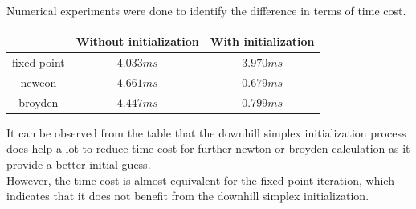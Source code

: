 \documentclass[paper=a4, fontsize=11pt]{scrartcl} %
\numberwithin{equation}{section} %
\numberwithin{figure}{section} %
\numberwithin{table}{section} %
\begin{document}
	Numerical experiments were done to identify the difference in terms of time cost. 
	
	\begin{center}
		\begin{tabular}{ccc}
			\hline
			\quad       & Without initialization & With initialization\\
			\hline
			fixed-point & $4.033 ms$             & $3.970 ms$\\
			neweon      & $4.661 ms$             & $0.679 ms$\\
			broyden     & $4.447 ms$             & $0.799 ms$\\
			\hline
		\end{tabular}
	\end{center}
	
	It can be observed from the table that the downhill simplex initialization process does help a lot to reduce time cost for further newton or broyden calculation as it provide a better initial guess. \\
	However, the time cost is almost equivalent for the fixed-point iteration, which indicates that it does not benefit from the downhill simplex initialization. 
\end{document}
